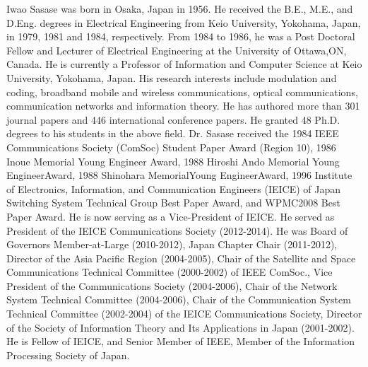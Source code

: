 \documentclass{ieeeaccess}
\begin{document}
\begin{IEEEbiography}{Iwao Sasase} was born in Osaka, Japan in 1956. He received the B.E., M.E., and D.Eng. degrees in Electrical Engineering from Keio University, Yokohama, Japan, in 1979, 1981 and 1984, respectively. From 1984 to 1986, he was a Post Doctoral Fellow and Lecturer of Electrical Engineering at the University of Ottawa,ON, Canada. He is currently a Professor of Information and Computer Science at Keio University, Yokohama, Japan. His research interests include modulation and coding, broadband mobile and  wireless communications, optical communications, communication networks and information theory. He has authored more than 301 journal papers and 446 international conference papers. He granted 48 Ph.D. degrees to his students in the above field. Dr. Sasase received the 1984 IEEE Communications Society (ComSoc) Student Paper Award (Region 10), 1986 Inoue Memorial Young Engineer Award, 1988 Hiroshi Ando Memorial Young EngineerAward, 1988 Shinohara MemorialYoung EngineerAward, 1996 Institute of Electronics, Information, and Communication Engineers (IEICE) of Japan Switching System Technical Group Best Paper Award, and WPMC2008 Best Paper Award. He is now serving as a Vice-President of IEICE. He served as President of the IEICE Communications Society (2012-2014). He was Board of Governors Member-at-Large (2010-2012), Japan Chapter Chair (2011-2012), Director of the Asia Pacific Region (2004-2005), Chair of the Satellite and Space Communications Technical Committee (2000-2002) of IEEE ComSoc., Vice President of the Communications Society (2004-2006), Chair of the Network System Technical Committee (2004-2006), Chair of the Communication System Technical Committee (2002-2004) of the IEICE Communications Society, Director of the Society of Information Theory and Its Applications in Japan (2001-2002). He is Fellow of IEICE, and Senior Member of IEEE, Member of the Information Processing Society of Japan.
\end{IEEEbiography}

\endgroup
\EOD
\end{document}

